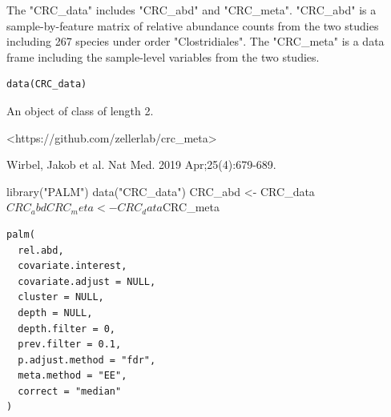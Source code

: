 \documentclass[a4paper]{book}
\begin{document}
%
\begin{Description}
The "CRC\_data" includes "CRC\_abd" and "CRC\_meta". "CRC\_abd" is a sample-by-feature matrix of
relative abundance counts from the two studies including 267 species under order "Clostridiales".
The "CRC\_meta" is a data frame including the sample-level variables from the two studies.
\end{Description}
%
\begin{Usage}
\begin{verbatim}
data(CRC_data)
\end{verbatim}
\end{Usage}
%
\begin{Format}
An object of class  of length 2.
\end{Format}
%
\begin{Source}
<https://github.com/zellerlab/crc\_meta>
\end{Source}
%
\begin{References}
Wirbel, Jakob et al. Nat Med. 2019 Apr;25(4):679-689.
\end{References}
%
\begin{Examples}
\begin{ExampleCode}

library("PALM")
data("CRC_data")
CRC_abd <- CRC_data$CRC_abd
CRC_meta <- CRC_data$CRC_meta


\end{ExampleCode}
\end{Examples}
%
\begin{Usage}
\begin{verbatim}
palm(
  rel.abd,
  covariate.interest,
  covariate.adjust = NULL,
  cluster = NULL,
  depth = NULL,
  depth.filter = 0,
  prev.filter = 0.1,
  p.adjust.method = "fdr",
  meta.method = "EE",
  correct = "median"
)
\end{verbatim}
\end{Usage}
%
\end{document}
